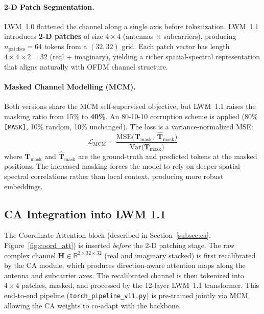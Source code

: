 \documentclass[12pt,a4paper]{article}
\begin{document}
\paragraph{2-D Patch Segmentation.}
LWM~1.0 flattened the channel along a single axis before tokenization. LWM~1.1 introduces \textbf{2-D patches} of size $4{\times}4$ (antennas $\times$ subcarriers), producing $n_\text{patches}=64$ tokens from a $(32,32)$ grid. Each patch vector has length $4 \times 4 \times 2 = 32$ (real + imaginary), yielding a richer spatial-spectral representation that aligns naturally with OFDM channel structure.

\paragraph{Masked Channel Modelling (MCM).}
Both versions share the MCM self-supervised objective, but LWM~1.1 raises the masking ratio from 15\% to \textbf{40\%}. An 80-10-10 corruption scheme is applied (80\% \texttt{[MASK]}, 10\% random, 10\% unchanged). The loss is a variance-normalized MSE:
\begin{equation}
    \mathcal{L}_{\text{MCM}} = \frac{\text{MSE}\!\bigl(\mathbf{T}_{\text{mask}},\;\hat{\mathbf{T}}_{\text{mask}}\bigr)}{\text{Var}\!\bigl(\mathbf{T}_{\text{mask}}\bigr)}
\end{equation}
where $\mathbf{T}_{\text{mask}}$ and $\hat{\mathbf{T}}_{\text{mask}}$ are the ground-truth and predicted tokens at the masked positions. The increased masking forces the model to rely on deeper spatial-spectral correlations rather than local context, producing more robust embeddings.

\subsection{CA Integration into LWM 1.1}\label{subsec:ca_lwm11}

The Coordinate Attention block (described in Section~\ref{subsec:ca}, Figure~\ref{fig:coord_att}) is inserted \emph{before} the 2-D patching stage. The raw complex channel $\mathbf{H} \in \mathbb{R}^{2 \times 32 \times 32}$ (real and imaginary stacked) is first recalibrated by the CA module, which produces direction-aware attention maps along the antenna and subcarrier axes. The recalibrated channel is then tokenized into $4{\times}4$ patches, masked, and processed by the 12-layer LWM~1.1 transformer. This end-to-end pipeline (\texttt{torch\_pipeline\_v11.py}) is pre-trained jointly via MCM, allowing the CA weights to co-adapt with the backbone.
\end{document}
